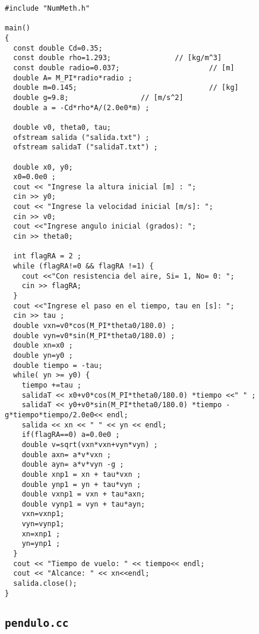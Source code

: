 \begin{verbatim}
#include "NumMeth.h"

main()
{
  const double Cd=0.35;
  const double rho=1.293;               // [kg/m^3]
  const double radio=0.037;                     // [m]
  double A= M_PI*radio*radio ;  
  double m=0.145;                               // [kg] 
  double g=9.8;                 // [m/s^2]
  double a = -Cd*rho*A/(2.0e0*m) ;

  double v0, theta0, tau;
  ofstream salida ("salida.txt") ;
  ofstream salidaT ("salidaT.txt") ;

  double x0, y0; 
  x0=0.0e0 ;
  cout << "Ingrese la altura inicial [m] : ";
  cin >> y0;
  cout << "Ingrese la velocidad inicial [m/s]: ";
  cin >> v0;
  cout <<"Ingrese angulo inicial (grados): ";
  cin >> theta0;

  int flagRA = 2 ;
  while (flagRA!=0 && flagRA !=1) {
    cout <<"Con resistencia del aire, Si= 1, No= 0: ";
    cin >> flagRA;
  }
  cout <<"Ingrese el paso en el tiempo, tau en [s]: "; 
  cin >> tau ;
  double vxn=v0*cos(M_PI*theta0/180.0) ;
  double vyn=v0*sin(M_PI*theta0/180.0) ;
  double xn=x0 ;
  double yn=y0 ;
  double tiempo = -tau;
  while( yn >= y0) {
    tiempo +=tau ;
    salidaT << x0+v0*cos(M_PI*theta0/180.0) *tiempo <<" " ;
    salidaT << y0+v0*sin(M_PI*theta0/180.0) *tiempo -g*tiempo*tiempo/2.0e0<< endl;
    salida << xn << " " << yn << endl;
    if(flagRA==0) a=0.0e0 ; 
    double v=sqrt(vxn*vxn+vyn*vyn) ;
    double axn= a*v*vxn ;
    double ayn= a*v*vyn -g ;
    double xnp1 = xn + tau*vxn ;
    double ynp1 = yn + tau*vyn ;
    double vxnp1 = vxn + tau*axn;
    double vynp1 = vyn + tau*ayn;
    vxn=vxnp1;
    vyn=vynp1;
    xn=xnp1 ;
    yn=ynp1 ;
  }
  cout << "Tiempo de vuelo: " << tiempo<< endl;
  cout << "Alcance: " << xn<<endl;
  salida.close();
}
\end{verbatim}

\subsection{\tt pendulo.cc}

